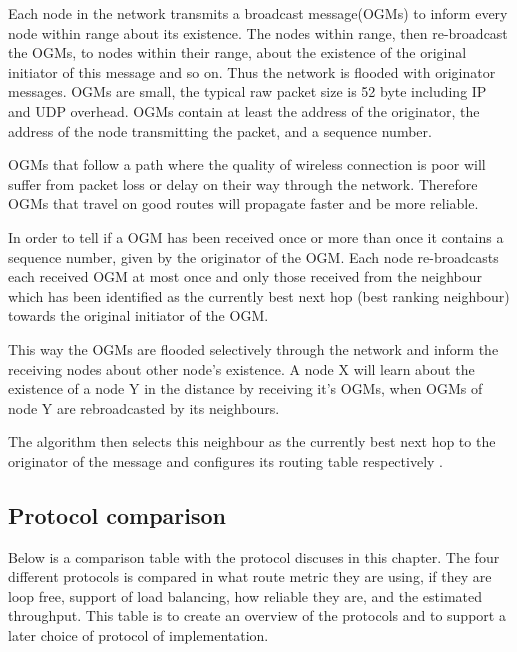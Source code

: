 Each node in the network transmits a broadcast message(OGMs) to inform every node within range about its existence.
The nodes within range, then re-broadcast the OGMs, to nodes within their range, about the existence of the original initiator of this message and so on.
Thus the network is flooded with originator messages. OGMs are small, the typical raw packet size is 52 byte including IP and UDP overhead.
OGMs contain at least the address of the originator, the address of the node transmitting the packet, and a sequence number.

OGMs that follow a path where the quality of wireless connection is poor will suffer from packet loss or delay on their way through the network.
Therefore OGMs that travel on good routes will propagate faster and be more reliable.

In order to tell if a OGM has been received once or more than once it contains a sequence number, given by the originator of the OGM.
Each node re-broadcasts each received OGM at most once and only those received from the neighbour which has been identified as the currently best next hop (best ranking neighbour) towards the original initiator of the OGM.

This way the OGMs are flooded selectively through the network and inform the receiving nodes about other node's existence. 
A node X will learn about the existence of a node Y in the distance by receiving it's OGMs, when OGMs of node Y are rebroadcasted by its neighbours.

The algorithm then selects this neighbour as the currently best next hop to the originator of the message and configures its routing table respectively \cite{BATMAN}.

\subsection{Protocol comparison}
Below is a comparison table with the protocol discuses in this chapter.
The four different protocols is compared in what route metric they are using, if they are loop free, support of load balancing, how reliable they are, and the estimated throughput.
This table is to create an overview of the protocols and to support a later choice of protocol of implementation.

